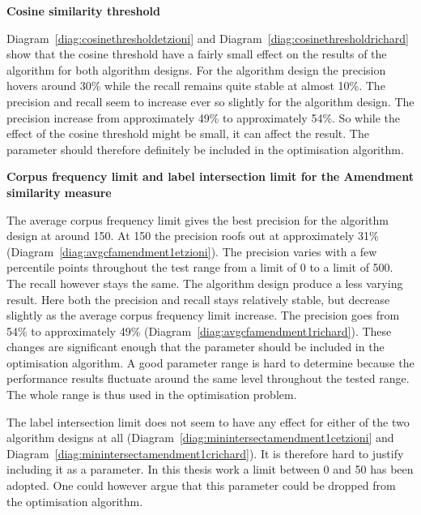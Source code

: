 \textbf{Cosine similarity threshold}

Diagram~\ref{diag:cosinethresholdetzioni} and Diagram~\ref{diag:cosinethresholdrichard} show that the cosine threshold have a fairly small effect on the results of the algorithm for both algorithm designs. For the \citeauthor{Oren1998} algorithm design the precision hovers around 30\% while the recall remains quite stable at almost 10\%. The precision and recall seem to increase ever so slightly for the \citeauthor{Moe2014compact} algorithm design. The precision increase from approximately  49\% to approximately  54\%. So while the effect of the cosine threshold might be small, it can affect the result. The parameter should therefore definitely be included in the optimisation algorithm.


\textbf{Corpus frequency limit and label intersection limit for the Amendment similarity measure}

The average corpus frequency limit gives the best precision for the \citeauthor{Oren1998} algorithm design at around 150. At 150 the precision roofs out at approximately 31\% (Diagram~\ref{diag:avgcfamendment1etzioni}). The precision varies with a few percentile points throughout the test range from a limit of 0 to a limit of 500. The recall however stays the same. The \citeauthor{Moe2014compact} algorithm design produce a less varying result. Here both the precision and recall stays relatively stable, but decrease slightly as the average corpus frequency limit increase. The precision goes from 54\% to approximately 49\% (Diagram~\ref{diag:avgcfamendment1richard}). These changes are significant enough that the parameter should be included in the optimisation algorithm. A good parameter range is hard to determine because the performance results fluctuate around the same level throughout the tested range. The whole range is thus used in the optimisation problem.

The label intersection limit does not seem to have any effect for either of the two algorithm designs at all (Diagram~\ref{diag:minintersectamendment1cetzioni} and Diagram~\ref{diag:minintersectamendment1crichard}). It is therefore hard to justify including it as a parameter. In this thesis work a limit between 0 and 50 has been adopted. One could however argue that this parameter could be dropped from the optimisation algorithm.

